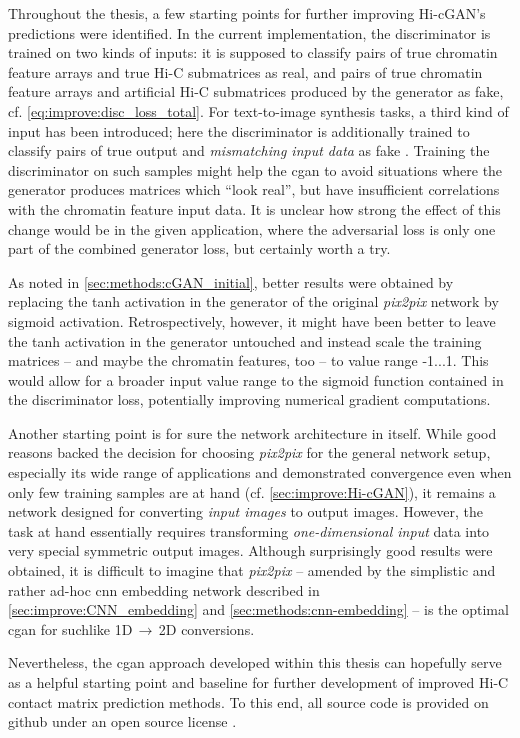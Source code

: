 Throughout the thesis, a few starting points for further improving Hi-cGAN's predictions were identified.
In the current implementation, the discriminator is trained on two kinds of inputs:
it is supposed to classify pairs of true chromatin feature arrays and true Hi-C submatrices as real, 
and pairs of true chromatin feature arrays and artificial Hi-C submatrices produced by the generator as fake, cf. \cref{eq:improve:disc_loss_total}.
For text-to-image synthesis tasks, a third kind of input has been introduced; here the discriminator is additionally trained 
to classify pairs of true output and \emph{mismatching input data} as fake \cite{Reed2016}.
Training the discriminator on such samples might help the \acrshort{cgan} to avoid situations 
where the generator produces matrices which ``look real'', 
but have insufficient correlations with the chromatin feature input data.
It is unclear how strong the effect of this change would be in the given application, 
where the adversarial loss is only one part of the combined generator loss, but certainly worth a try.

As noted in \cref{sec:methods:cGAN_initial}, better results were obtained by replacing the tanh activation in the generator 
of the original \emph{pix2pix} network by sigmoid activation.
Retrospectively, however, it might have been better to leave the tanh activation in the generator untouched
and instead scale the training matrices -- and maybe the chromatin features, too -- to value range -1...1.
This would allow for a broader input value range to the sigmoid function contained in the discriminator loss,
potentially improving numerical gradient computations.

Another starting point is for sure the network architecture in itself.
While good reasons backed the decision for choosing \emph{pix2pix} for the general network setup,
especially its wide range of applications and demonstrated convergence even when only few training 
samples are at hand \cite{Isola2017} (cf. \cref{sec:improve:Hi-cGAN}),
it remains a network designed for converting \emph{input images} to output images.
However, the task at hand essentially requires transforming \emph{one-dimensional input} data into very special symmetric output images.
Although surprisingly good results were obtained, it is difficult to imagine that \emph{pix2pix} -- amended by the simplistic and rather ad-hoc \acrshort{cnn} embedding network 
described in \cref{sec:improve:CNN_embedding} and \ref{sec:methods:cnn-embedding} -- is the optimal \acrshort{cgan} for suchlike 1D\,$\rightarrow$\,2D conversions.

Nevertheless, the \acrshort{cgan} approach developed within this thesis can hopefully serve as a helpful starting point and baseline
for further development of improved Hi-C contact matrix prediction methods.
To this end, all source code is provided on github under an open source license \cite{Krauth2021a, Krauth2021b}.
\clearpage
